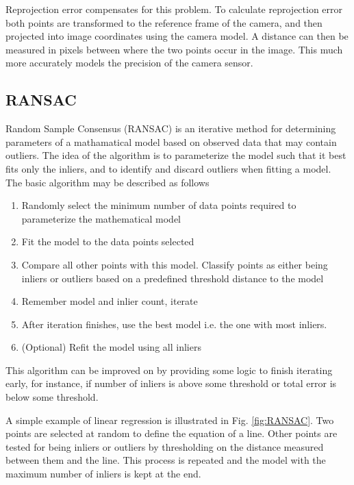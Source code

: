 Reprojection error compensates for this problem.  To calculate reprojection error both points are transformed to the reference frame of the camera, and then projected into image coordinates using the camera model.  A distance can then be measured in pixels between where the two points occur in the image.  This much more accurately models the precision of the camera sensor.

\subsection{RANSAC}
\label{subsec:RANSAC}

Random Sample Consensus (RANSAC) is an iterative method for determining parameters of a mathamatical model based on observed data that may contain outliers.  The idea of the algorithm is to parameterize the model such that it best fits only the inliers, and to identify and discard outliers when fitting a model.  The basic algorithm may be described as follows

\begin{enumerate}
 \item Randomly select the minimum number of data points required to parameterize the mathematical model
 \item Fit the model to the data points selected
 \item Compare all other points with this model.  Classify points as either being inliers or outliers based on a predefined threshold distance to the model
 \item Remember model and inlier count, iterate
 \item After iteration finishes, use the best model i.e. the one with most inliers.
 \item (Optional) Refit the model using all inliers
\end{enumerate}

This algorithm can be improved on by providing some logic to finish iterating early, for instance, if number of inliers is above some threshold or total error is below some threshold.

A simple example of linear regression is illustrated in Fig. \ref{fig:RANSAC}.  Two points are selected at random to define the equation of a line.  Other points are tested for being inliers or outliers by thresholding on the distance measured between them and the line.  This process is repeated and the model with the maximum number of inliers is kept at the end.

